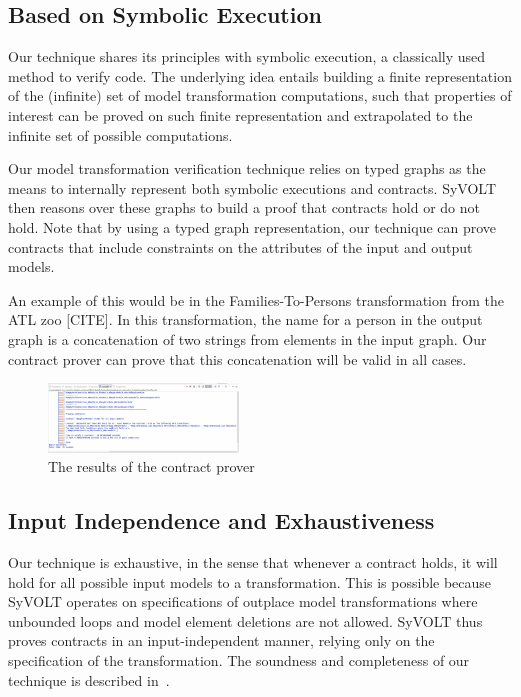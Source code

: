 \subsection{Based on Symbolic Execution}

Our technique shares its principles with symbolic execution, a
classically used method to verify code. The underlying idea entails building a
finite representation of the (infinite) set of model transformation
computations, such that properties of interest can be proved on such finite
representation and extrapolated to the infinite set of possible computations.

Our model transformation verification technique relies on typed graphs as the
means to internally represent both symbolic executions and contracts. SyVOLT
then reasons over these graphs to build a proof that contracts hold or do not
hold. Note that by using a typed graph representation, our technique can prove
contracts that include constraints on the attributes of the input and output
models.

 An example of this would be in the
Families-To-Persons transformation from the ATL zoo [CITE]. In this transformation, the name for a person in the
output graph is a concatenation of two strings  from elements in the input graph. Our contract prover
can prove that this concatenation will be valid in all cases.

\begin{figure}
\centering
\includegraphics[width=0.45\textwidth]{figures/output}
\caption{The results of the contract prover}
\label{fig:output}
\end{figure}

\subsection{Input Independence and Exhaustiveness} 

Our technique is exhaustive, in the sense that whenever a contract holds, it
will hold for all possible input models to a transformation. This is possible
because SyVOLT operates on specifications of outplace model transformations
where unbounded loops and model element deletions are not allowed. SyVOLT thus proves
contracts in an input-independent manner, relying only on the specification of the
transformation. The soundness and completeness of our technique is described
in~\cite{Lucio2014}.

